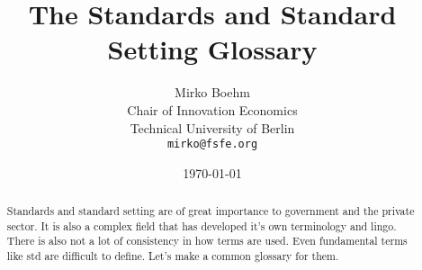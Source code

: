 \documentclass[a4paper]{article}
\title{The Standards and Standard Setting Glossary}
\author{Mirko Boehm\\
  Chair of Innovation Economics\\
  Technical University of Berlin\\
  \texttt{mirko@fsfe.org}}
\date{\today}
\begin{document}
\maketitle \thispagestyle{empty}
\begin{abstract}
  \noindent
  Standards and standard setting are of great importance to government
  and the private sector. It is also a complex field that has
  developed it's own terminology and lingo. There is also not a lot of
  consistency in how terms are used. Even fundamental terms like
  \gls{std} are difficult to define. Let's make a common glossary for
  them.
\end{abstract}

\clearpage
\glsaddall
\printnoidxglossary[type=\acronymtype,nonumberlist]
\clearpage
\printnoidxglossary[nonumberlist]
% 
\end{document}
